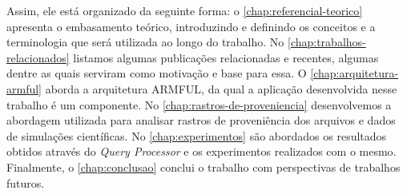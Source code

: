 Assim, ele está organizado da seguinte forma:
o \autoref{chap:referencial-teorico} apresenta o embasamento teórico, introduzindo e definindo os conceitos e a terminologia que será utilizada ao longo do trabalho.
No \autoref{chap:trabalhos-relacionados} listamos algumas publicações relacionadas e recentes, algumas dentre as quais serviram como motivação e base para essa.
O \autoref{chap:arquitetura-armful} aborda a arquitetura ARMFUL, da qual a aplicação desenvolvida nesse trabalho é um componente.
No \autoref{chap:rastros-de-proveniencia} desenvolvemos a abordagem utilizada para analisar rastros de proveniência dos arquivos e dados de simulações científicas.
No \autoref{chap:experimentos} são abordados os resultados obtidos através do \textit{Query Processor} e os experimentos realizados com o mesmo.
Finalmente, o \autoref{chap:conclusao} conclui o trabalho com perspectivas de trabalhos futuros.
